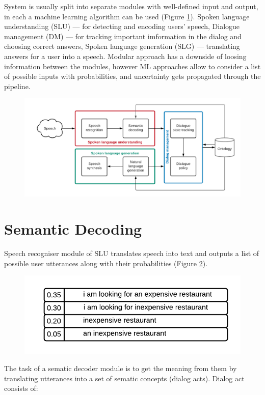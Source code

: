 \documentclass[12pt,titlepage,a4paper]{article}
\begin{document}
System is usually split into separate modules with well-defined input and output, in each a machine learning algo\-rithm can be used (Figure \ref{fig:SDS-main}). Spoken language understanding (SLU) --- for detecting and encoding users' speech, Dialogue manage\-ment (DM) --- for tracking important imformation in the dialog and choosing correct answers, Spoken language gene\-ration (SLG) --- translating answers for a user into a speech. Modular approach has a downside of loosing information bet\-ween the modules, however ML approaches allow to consider a list of possible inputs with probabilities, and uncertainty gets propagated through the pipeline.

\begin{figure}[!h]
    \includegraphics[width=\linewidth]{SDS-main.png}
    \caption{}
    \label{fig:SDS-main}
\end{figure}


\pagebreak
\section{Semantic Decoding}
Speech recogniser module of SLU translates speech into text and outputs a list of possible user utterances along with their probabilities (Figure \ref{fig:several}).

\begin{figure}[!h]
    \centering
    \includegraphics[width=0.65\linewidth]{uncertanty.png}
    \caption{}
    \label{fig:several}
\end{figure}
The task of a sematic decoder module is to get the meaning from them by translating utterances into a set of sematic concepts (dia\-log acts). Dialog act consists of: 
\end{document}
